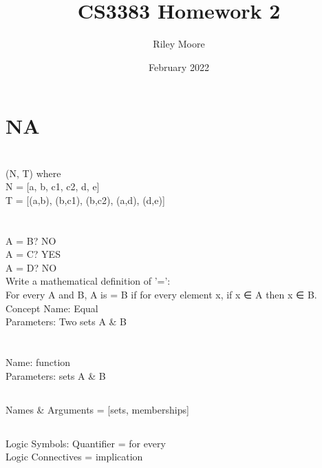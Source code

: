 \documentclass{article}
\title{CS3383 Homework 2}
\author{Riley Moore}
\date{February 2022}
\begin{document}
\maketitle

\section{NA}

\section{}
(N, T) where\\
N = [a, b, c1, c2, d, e] \\    
T = [(a,b), (b,c1), (b,c2), (a,d), (d,e)]

\section{}
A = B? NO\\
A = C? YES\\
A = D? NO\\
Write a mathematical definition of '=':\\
For every A and B, A is = B if for every element x, if x ∈ A then x ∈ B.
Concept Name: Equal\\
Parameters: Two sets A & B\\


\section{}


\section{}
\subsection{}
Name: function \\
Parameters: sets A & B
\subsection{}
Names & Arguments = [sets, memberships]
\subsection{}
Logic Symbols: Quantifier = for every\\
               Logic Connectives = implication
\end{document}
